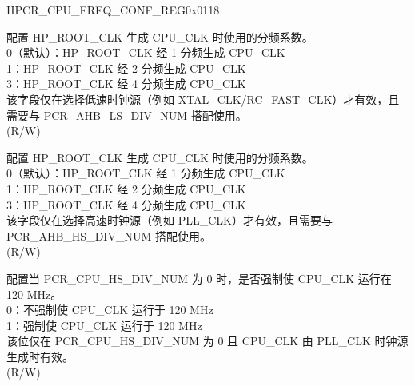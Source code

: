 \begin{register}{H}{PCR\_CPU\_FREQ\_CONF\_REG}{0x0118}\label{regdesc:PCRCPUFREQCONFREG}
%
%
%
%
\regnewline%
\begin{regdesc}\begin{reglist}
\label{fielddesc:PCRCPULSDIVNUM}\item [PCR\_CPU\_LS\_DIV\_NUM] 配置 HP\_ROOT\_CLK 生成 CPU\_CLK 时使用的分频系数。\\
0（默认）：HP\_ROOT\_CLK 经 1 分频生成 CPU\_CLK\\
1：HP\_ROOT\_CLK 经 2 分频生成 CPU\_CLK\\
3：HP\_ROOT\_CLK 经 4 分频生成 CPU\_CLK\\
该字段仅在选择低速时钟源（例如 XTAL\_CLK/RC\_FAST\_CLK）才有效，且需要与 PCR\_AHB\_LS\_DIV\_NUM 搭配使用。 \\ (R/W)
\label{fielddesc:PCRCPUHSDIVNUM}\item [PCR\_CPU\_HS\_DIV\_NUM] 配置 HP\_ROOT\_CLK 生成 CPU\_CLK 时使用的分频系数。\\
0（默认）：HP\_ROOT\_CLK 经 1 分频生成 CPU\_CLK\\
1：HP\_ROOT\_CLK 经 2 分频生成 CPU\_CLK\\
3：HP\_ROOT\_CLK 经 4 分频生成 CPU\_CLK\\
该字段仅在选择高速时钟源（例如 PLL\_CLK）才有效，且需要与 PCR\_AHB\_HS\_DIV\_NUM 搭配使用。\\ (R/W)
\label{fielddesc:PCRCPUHS120MFORCE}\item [PCR\_CPU\_HS\_120M\_FORCE] 配置当 PCR\_CPU\_HS\_DIV\_NUM 为 0 时，是否强制使 CPU\_CLK 运行在 120 MHz。\\
0：不强制使 CPU\_CLK 运行于 120 MHz\\
1：强制使 CPU\_CLK 运行于 120 MHz\\
该位仅在 PCR\_CPU\_HS\_DIV\_NUM 为 0 且 CPU\_CLK 由 PLL\_CLK 时钟源生成时有效。\\ (R/W)
\end{reglist}\end{regdesc}
\end{register}


